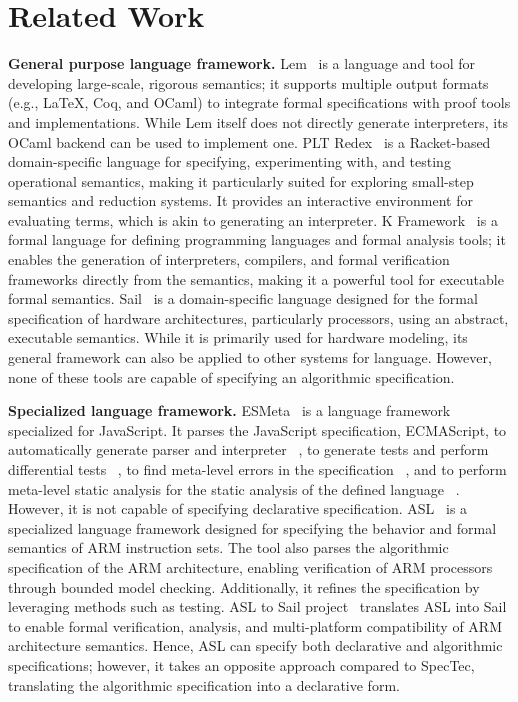 
\chapter{Related Work}
\label{ch:related}
\noindent


\textbf{General purpose language framework.}
Lem~\cite{lem} is a language and tool for developing large-scale, rigorous
semantics; it supports multiple output formats (e.g., LaTeX, Coq, and OCaml) to
integrate formal specifications with proof tools and implementations.
While Lem itself does not directly generate interpreters, its OCaml backend can
be used to implement one.
PLT Redex~\cite{plt} is a Racket-based domain-specific language for specifying,
experimenting with, and testing operational semantics, making it particularly
suited for exploring small-step semantics and reduction systems.
It provides an interactive environment for evaluating terms, which is akin to
generating an interpreter.
K Framework~\cite{k} is a formal language for defining programming languages
and formal analysis tools; it enables the generation of interpreters,
compilers, and formal verification frameworks directly from the semantics,
making it a powerful tool for executable formal semantics.
Sail~\cite{sail} is a domain-specific language designed for the formal
specification of hardware architectures, particularly processors, using an
abstract, executable semantics.
While it is primarily used for hardware modeling, its general framework can
also be applied to other systems for language.
However, none of these tools are capable of specifying an algorithmic
specification.


\textbf{Specialized language framework.}
ESMeta~\cite{esmeta} is a language framework specialized for JavaScript.
It parses the JavaScript specification, ECMAScript, to automatically generate
parser and interpreter ~\cite{jiset}, to generate tests and perform
differential tests ~\cite{jest}, to find meta-level errors in the specification
~\cite{jstar}, and to perform meta-level static analysis for the static
analysis of the defined language ~\cite{jsaver}.
However, it is not capable of specifying declarative specification.
ASL~\cite{asl} is a specialized language framework designed for specifying the
behavior and formal semantics of ARM instruction sets.
The tool also parses the algorithmic specification of the ARM architecture,
enabling verification of ARM processors through bounded model checking.
Additionally, it refines the specification by leveraging methods such as
testing.
ASL to Sail project~\cite{asl2sail} translates ASL into Sail to enable formal
verification, analysis, and multi-platform compatibility of ARM architecture
semantics.
Hence, ASL can specify both declarative and algorithmic specifications;
however, it takes an opposite approach compared to SpecTec, translating the
algorithmic specification into a declarative form.
